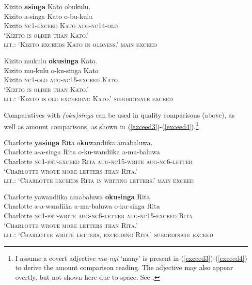 \documentclass[output=paper,
modfonts
]{langscibook}
\begin{document}
\begin{exe}
\ex\label{exceed1}
\glll  Kizito \textbf{asinga} Kato obukulu. \rm \\
 Kizito a-singa Kato o-bu-kulu \\ 
 Kizito \scshape nc1\rm-exceed Kato \scshape aug-nc14\rm-old \\
 \glt  `Kizito is older than Kato.' \\
lit.: `Kizito exceeds Kato in oldness.' \hfill {\sc main  exceed}

\ex\label{exceed2}
\glll Kizito mukulu \textbf{okusinga} Kato. \\
Kizito mu-kulu o-ku-singa Kato  \\ 
Kizito \scshape nc1\rm-old \scshape aug-nc15\rm-exceed Kato  \\
\glt `Kizito is older than Kato.' \\
lit.: `Kizito is old exceeding Kato.' \hfill {\sc subordinate exceed}
\end{exe}


Comparatives with {\it (oku)singa} can be used in quality comparisons (above), as well as amount comparisons, as shown in (\ref{exceed3})-(\ref{exceed4}).\footnote{I assume a covert adjective {\it ma-ngi} `many'  is present in (\ref{exceed3})-(\ref{exceed4}) to derive the amount comparison reading. The adjective may also appear overtly, but not shown here due to space. See \citealt{bochnak13crosslinguistic}.}


\begin{exe}
\ex\label{exceed3}
\glll Charlotte \textbf{yasinga} Rita o\textbf{ku}wandiika amabaluwa. \\
Charlotte a-a-singa Rita o-ku-wandiika a-ma-baluwa  \\
Charlotte \scshape nc1-pst\rm-exceed Rita \scshape aug-nc15\rm-write \scshape aug-nc6\rm-letter  \\
\glt `Charlotte wrote more letters than Rita.' \\
lit.: `Charlotte exceeds Rita in writing letters.' \hfill {\sc main  exceed}

\ex\label{exceed4}
\glll Charlotte yawandiika amabaluwa  \textbf{okusinga} Rita. \\
Charlotte a-a-wandiika a-ma-baluwa  o-ku-singa Rita \\
Charlotte \scshape nc1-pst\rm-write \scshape aug-nc6\rm-letter  \scshape aug-nc15\rm-exceed Rita \\
\glt `Charlotte wrote more letters than Rita.'  \\
lit.: `Charlotte wrote letters, exceeding Rita.' \hfill {\sc subordinate exceed}
\end{exe}
\end{document}
